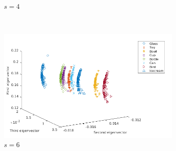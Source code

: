 \documentclass[10pt,a4paper]{article}
\begin{document}
\begin{figure}[H]
\begin{subfigure}[b]{0.5\textwidth}
		\caption{$s=4$}
		\label{}
	\end{subfigure}~
	\begin{subfigure}[b]{0.5\textwidth}
		\includegraphics[width= \textwidth]{images/Zeta-Mellin6.png}
		\caption{$s=6$}
		\label{}
	\end{subfigure}
	\caption{ }
	\label{}
\end{figure}
\end{document}
